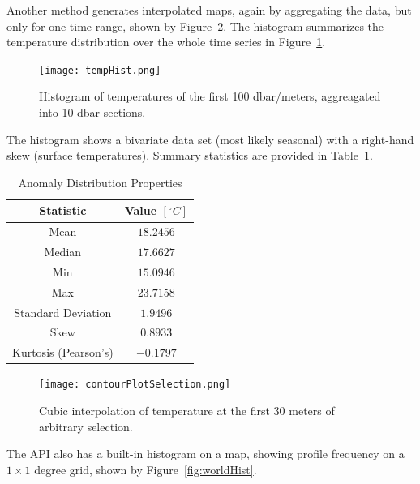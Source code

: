 Another method generates interpolated maps, again by aggregating the data, but only for one time range, shown by Figure~\ref{fig:contourPlotSelection}.
The histogram summarizes the temperature distribution over the whole time series in Figure~\ref{fig:tempHist}.

\begin{figure}[H]
\centering
\begin{minipage}{4in}
\texttt{[image: tempHist.png]}
\caption{\label{fig:tempHist}Histogram of temperatures of the first 100 dbar/meters, aggreagated into 10 dbar sections.}
\end{minipage}
\end{figure}

The histogram shows a bivariate data set (most likely seasonal) with a right-hand skew (surface temperatures). Summary statistics are provided in Table~\ref{tbl:tempHist}.

\begin{table}[hbt]
\centering
\caption{Anomaly Distribution Properties \label{tbl:tempHist}}
{\begin{tabular}{|c|c|}
\hline
\textbf{Statistic} & \textbf{Value} $[^\circ C]$
\\ \hline
Mean\hphantom{00} & \hphantom{0}$18.2456$
\\ \hline
Median\hphantom{00} & \hphantom{0}$17.6627$
\\ \hline
Min\hphantom{00} & \hphantom{0}$15.0946$
\\ \hline
Max\hphantom{00} & \hphantom{0}$23.7158$
\\ \hline
Standard Deviation\hphantom{00} & \hphantom{0}$1.9496$
\\ \hline
Skew\hphantom{00} & $0.8933$
\\ \hline
Kurtosis (Pearson's) \hphantom{00} & $-0.1797$
\\ \hline
\end{tabular} }
\end{table}

\begin{figure}[H]
\centering
\begin{minipage}{4in}
\texttt{[image: contourPlotSelection.png]}
\caption{\label{fig:contourPlotSelection}Cubic interpolation of temperature at the first 30 meters of arbitrary selection.}
\end{minipage}
\end{figure}

The API also has a built-in histogram on a map, showing profile frequency on a $1\times 1$ degree grid, shown by Figure~\ref{fig:worldHist}.

